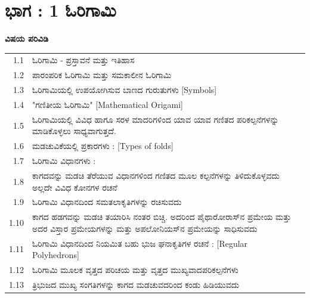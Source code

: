 


\chapter{ಭಾಗ :  1 ಓರಿಗಾಮಿ}\label{chap1}

\textbf{\Large ವಿಷಯ ಪರಿವಿಡಿ}

\medskip
\medskip

{%
\begin{longtable}[l]{@{}>{}r>{\raggedright}p{9.1cm}>{}r@{}}
\hline
1.1 & ಓರಿಗಾಮಿ - ಪ್ರಸ್ತಾವನೆ ಮತ್ತು ಇತಿಹಾಸ  \dotfill & \pageref{sec1.1}\\
1.2 & ಪಾರಂಪರಿಕ ಓರಿಗಾಮಿ ಮತ್ತು ಸಮಕಾಲೀನ ಓರಿಗಾಮಿ \dotfill & \pageref{sec1.2}\\
1.3 & ಓರಿಗಾಮಿಯಲ್ಲಿ ಉಪಯೋಗಿಸುವ ಬಾಣದ ಗುರುತುಗಳು [Symbols]  \dotfill & \pageref{sec1.3}\\
1.4&  "ಗಣಿತೀಯ ಓರಿಗಾಮಿ" [Mathematical Origami]\dotfill & \pageref{sec1.4}\\
1.5 & ಓರಿಗಾಮಿಯಲ್ಲಿ ವಿವಿಧ ಹಾಗೂ ಸರಳ ಮಾದರಿಗಳಿಂದ ಯಾವ ಯಾವ ಗಣಿತದ ಪರಿಕಲ್ಪನೆಗಳನ್ನು ಮಾಡಿಕೊಳ್ಳಲು ಸಾಧ್ಯವಾಗುತ್ತದೆ. \dotfill & \raisebox{-0.55cm}{\pageref{sec1.5}}\\
1.6 &ಮಡಚುವಿಕೆಯಲ್ಲಿ ಪ್ರಕಾರಗಳು : [Types of folds]  \dotfill & \pageref{sec1.6}\\
1.7 &ಓರಿಗಾಮಿ ವಿಧಾನಗಳು :  \dotfill & \pageref{sec1.7}\\
1.8 &  ಕಾಗದವನ್ನು ಮಡಚಿ ತೆರೆಯುವ ವಿಧಾನಗಳಿಂದ ಗಣಿತದ ಮೂಲ ಕಲ್ಪನೆಗಳನ್ನು ತಿಳಿದುಕೊಳ್ಳವದು ಅಲ್ಲದೇ ವಿವಿಧ ಕೋನಗಳ ರಚನೆ \dotfill & \raisebox{-0.55cm}{\pageref{sec1.8}}\\
1.9 & ಓರಿಗಾಮಿ ವಿಧಾನದಿಂದ ಸಮತಲಾಕೃತಿಗಳನ್ನು ರಚಿಸುವದು \dotfill & \pageref{sec1.9}\\
1.10 & ಕಾಗದ ಹಡಗವನ್ನು ಮಡಚಿ ತಯಾರಿಸಿ ನಂತರ ಬಿಚ್ಚಿ. ಅದರಿಂದ ಪೈಥಾರೋರಾಸ್‌ನ ಪ್ರಮೇಯ ಮತ್ತು ಅದರ ವಿಸ್ತಾರ ಪ್ರಮೇಯಗಳನ್ನು ಮತ್ತು ಅಪಲೋನಿಯಸ್‌ನ ಪ್ರಮೇಯನ್ನು ಸಾಧಿಸುವದು  \dotfill & \raisebox{-1.1cm}{\pageref{sec1.10}}\\
1.11 & ಓರಿಗಾಮಿ ವಿಧಾನದಿಂದ  ನಿಯಮಿತ ಬಹು ಭುಜ ಘನಾಕೃತಿಗಳ ರಚನೆ : [Regular Polyhedrons] \dotfill & \raisebox{-0.55cm}{\pageref{sec1.11}}\\
1.12 & ಓರಿಗಾಮಿ ಮೂಲಕ ವೃತ್ತದ ಪರಿಚಯ ಮತ್ತು ವೃತ್ತದ ಮುಖ್ಯವಾದ\break ಪರಿಕಲ್ಪನೆಗಳು \dotfill & \raisebox{-0.55cm}{\pageref{sec1.12}}\\
1.13 & ತ್ರಿಭುಜದ ಮುಖ್ಯ ಸಂಗತಿಗಳನ್ನು ಕಾಗದ ಮಡಚುವದರಿಂದ ಕಂಡು ಹಿಡಿಯುವದು \dotfill & \raisebox{-0.55cm}{\pageref{sec1.13}}\\
\hline
\end{longtable}}\relax


